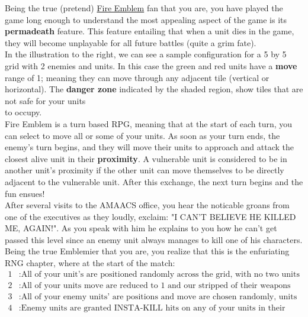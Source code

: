 

\noindent Being the true (pretend) \href{https://en.wikipedia.org/wiki/Fire_Emblem}{Fire Emblem} fan  that
you are, you have played the game long enough to understand the most appealing aspect of the game is its
\textbf{permadeath} feature.  This feature entailing that when a unit dies in the game, they will become unplayable for all
future battles (quite a grim fate). \\

\noindent In the illustration to the right, we can see a sample configuration for a 5 by 5 grid with 2 enemies and
units. In this case the green and red units have a \textbf{move} range of 1; meaning they can move through any adjacent tile
(vertical or horizontal). The \textbf{danger zone} indicated by the shaded region, show tiles that are not safe for
your units \\ to occupy. \\

\noindent  Fire Emblem is a turn based RPG, meaning that at the start of each turn, you can select to move all or some
of your units. As soon as your turn ends, the enemy's turn begins, and they will move their units to approach and
attack the closest alive unit in their \textbf{proximity}.  A vulnerable unit is considered to be in another unit's
proximity if the other unit can move themselves to be directly adjacent to the vulnerable unit. After this exchange,
the next turn begins and the fun ensues!\\


\noindent After several visits to the AMAACS office, you hear the noticable groans from one of the executives as they
loudly, exclaim: "I CAN'T BELIEVE HE KILLED ME, AGAIN!". As you speak with him he explains to you how he can't get
passed this level since an enemy unit always manages to kill one of his characters.  Being the true Emblemier that you
are, you realize that this is the enfuriating RNG chapter, where at the start of the match:
\begin{align*}
1 &: \text{All of your unit's are positioned randomly across the grid, with no two units being adjacent.}\\
2 &: \text{All of your units move are reduced to 1 and our stripped of their weapons for the duration of this turn.} \\
3 &: \text{All of your enemy units' are positions and move are chosen randomly, units may be adjacent with your own units} \\
4 &: \text{Enemy units are granted INSTA-KILL hits on any of your units in their proximity}
\end{align*}

